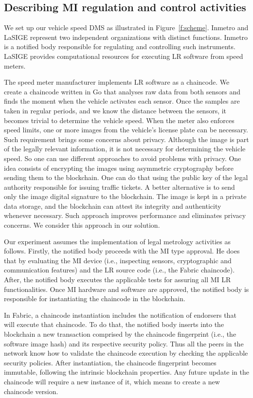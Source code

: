 \documentclass[journal]{IEEEtran}
\begin{document}
\subsection{Describing MI regulation and control activities}
We set up our vehicle speed DMS as illustrated in Figure~\ref{f:scheme}.
Inmetro and LaSIGE represent two independent organizations with distinct functions.
Inmetro is a notified body responsible for regulating and controlling such instruments.
LaSIGE provides computational resources for executing LR software from speed meters.

The speed meter manufacturer implements LR software as a chaincode. 
We create a chaincode written in Go that analyses raw data from both sensors and finds the moment when the vehicle activates each sensor.
Once the samples are taken in regular periods, and we know the distance between the sensors, it becomes trivial to determine the vehicle speed.
When the meter also enforces speed limits, one or more images from the vehicle's license plate can be necessary.
Such requirement brings some concerns about privacy.
Although the image is part of the legally relevant information, it is not necessary for determining the vehicle speed.
So one can use different approaches to avoid problems with privacy.
One idea consists of encrypting the images using asymmetric cryptography before sending them to the blockchain.
One can do that using the public key of the legal authority responsible for issuing traffic tickets.
A better alternative is to send only the image digital signature to the blockchain.
The image is kept in a private data storage, and the blockchain can attest its integrity and authenticity whenever necessary.
Such approach improves performance and eliminates privacy concerns.
We consider this approach in our solution.

Our experiment assumes the implementation of legal metrology activities as follows.
Firstly, the notified body proceeds with the MI type approval.
He does that by evaluating the MI device (i.e., inspecting sensors, cryptographic and communication features) and the LR source code (i.e., the Fabric chaincode).
After, the notified body executes the applicable tests for assuring all MI LR functionalities.
Once MI hardware and software are approved, the notified body is responsible for instantiating the chaincode in the blockchain.

In Fabric, a chaincode instantiation includes the notification of endorsers that will execute that chaincode.
To do that, the notified body inserts into the blockchain a new transaction comprised by the chaincode fingerprint (i.e., the software image hash) and its respective security policy.
Thus all the peers in the network know how to validate the chaincode execution by checking the applicable security policies.
After instantiation, the chaincode fingerprint becomes immutable, following the intrinsic blockchain properties.
Any future update in the chaincode will require a new instance of it, which means to create a new chaincode version.
\end{document}
